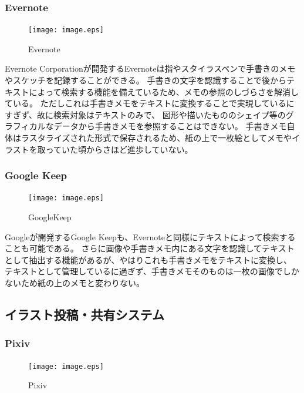 \subsubsection{Evernote}

\begin{figure}[htbp]
    \begin{center}
    {\texttt{[image: image.eps]}} \end{center}
    \caption{Evernote}
\end{figure}

Evernote Corporationが開発するEvernoteは指やスタイラスペンで手書きのメモやスケッチを記録することができる。
手書きの文字を認識することで後からテキストによって検索する機能を備えているため、メモの参照のしづらさを解消している。
ただしこれは手書きメモをテキストに変換することで実現しているにすぎず、故に検索対象はテキストのみで、
図形や描いたもののシェイプ等のグラフィカルなデータから手書きメモを参照することはできない。
手書きメモ自体はラスタライズされた形式で保存されるため、紙の上で一枚絵としてメモやイラストを取っていた頃からさほど進歩していない。

\subsubsection{Google Keep}

\begin{figure}[htbp]
    \begin{center}
    {\texttt{[image: image.eps]}} \end{center}
    \caption{GoogleKeep}
\end{figure}


Googleが開発するGoogle Keepも、Evernoteと同様にテキストによって検索することも可能である。
さらに画像や手書きメモ内にある文字を認識してテキストとして抽出する機能があるが、やはりこれも手書きメモをテキストに変換し、
テキストとして管理しているに過ぎず、手書きメモそのものは一枚の画像でしかないため紙の上のメモと変わりない。

\subsection{イラスト投稿・共有システム}

\subsubsection{Pixiv}

\begin{figure}[htbp]
    \begin{center}
    {\texttt{[image: image.eps]}} \end{center}
    \caption{Pixiv}
\end{figure}

